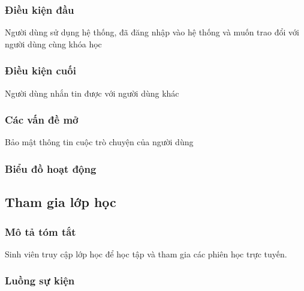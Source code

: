 \documentclass[./../main_file.tex]{subfiles}
\begin{document}
\subsubsection{Điều kiện đầu}
Người dùng sử dụng hệ thống, đã đăng nhập vào hệ thống và muốn trao đổi với người dùng cùng khóa học

\subsubsection{Điều kiện cuối}
Người dùng nhắn tin được với người dùng khác

\subsubsection{Các vấn đề mở}
Bảo mật thông tin cuộc trò chuyện của người dùng

\subsubsection{Biểu đồ hoạt động}

\subsection{Tham gia lớp học}
\subsubsection{Mô tả tóm tắt}
Sinh viên truy cập lớp học để học tập và tham gia các phiên học trực tuyến.

\subsubsection{Luồng sự kiện}
\end{document}
